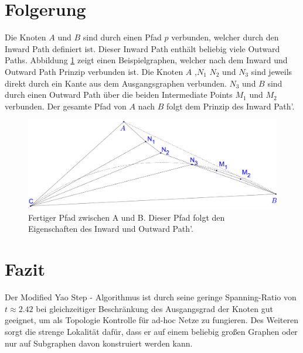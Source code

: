\documentclass[a4paper,twoside]{IEEEtran}
\begin{document}
\section{Folgerung}
Die Knoten $A $ und $B $ sind durch einen Pfad $p $ verbunden, welcher durch den Inward Path definiert ist.
Dieser Inward Path enthält beliebig viele Outward Paths.
Abbildung \ref{fig:complete} zeigt einen Beispielgraphen, welcher nach dem Inward und Outward Path Prinzip verbunden ist.
Die Knoten $A $ ,$N_1 $ $N_2 $ und $N_3 $ sind jeweils direkt durch ein Kante aus dem Ausgangsgraphen verbunden.
$N_3 $ und $B $ sind durch einen Outward Path über die beiden Intermediate Points $M_1 $ und $M_2 $ verbunden.
Der gesamte Pfad von $A $ nach $B $ folgt dem Prinzip des Inward Path'.

\begin{figure}[h!]
\centering
\includegraphics[width=1\linewidth]{complete_path.eps}
\caption{Fertiger Pfad zwischen A und B. Dieser Pfad folgt den Eigenschaften des Inward und Outward Path'.}
\label{fig:complete}
\end{figure}


\section{Fazit}
Der Modified Yao Step - Algorithmus ist durch seine geringe Spanning-Ratio von $t\approx 2.42$ bei gleichzeitiger Beschränkung des Ausgangsgrad der Knoten gut geeignet, um als Topologie Kontrolle für ad-hoc Netze zu fungieren.
Des Weiteren sorgt die strenge Lokalität dafür, dass er auf einem beliebig großen Graphen oder nur auf Subgraphen davon konstruiert werden kann.









\end{document}
